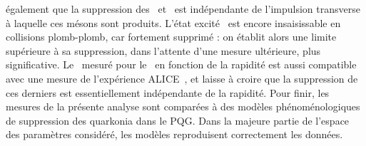 également que la suppression des \PgUa\ et \PgUb\ est indépendante de
l'impulsion transverse à laquelle ces mésons sont produits. L'état
excité \PgUc\ est encore insaisissable en collisions plomb-plomb, car
fortement supprimé : on établit alors une limite supérieure à sa
suppression, dans l'attente d'une mesure ultérieure, plus
significative. Le \RAA\ mesuré pour le \PgUa\ en fonction de la
rapidité est aussi compatible avec une mesure de l'expérience ALICE~\cite{ALICEUpsilonHI},
et laisse à croire que la suppression de ces derniers est
essentiellement indépendante de la rapidité. Pour finir, les mesures
de la présente analyse sont comparées à des modèles phénoménologiques
de suppression des quarkonia dans le PQG. Dans la majeure partie de
l'espace des paramètres considéré, les modèles reproduisent
correctement les données.

